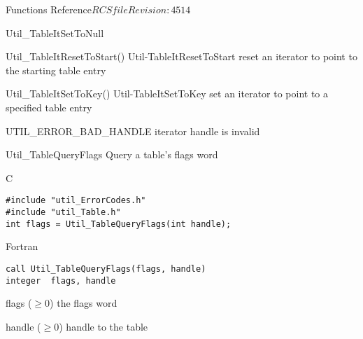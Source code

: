 \begin{cactuspart}{ Functions Reference}{$RCSfile$}{$Revision: 4514 $}
\begin{FunctionDescription}{Util\_TableItSetToNull}
\begin{SeeAlsoSection}
\begin{SeeAlso2} {Util\_TableItResetToStart()} {Util-TableItResetToStart}
reset an iterator to point to the starting table entry
\end{SeeAlso2}
\begin{SeeAlso2} {Util\_TableItSetToKey()} {Util-TableItSetToKey}
set an iterator to point to a specified table entry
\end{SeeAlso2}
\end{SeeAlsoSection}

\begin{ErrorSection}
\begin{Error}{UTIL\_ERROR\_BAD\_HANDLE}
iterator handle is invalid
\end{Error}
\end{ErrorSection}
\end{FunctionDescription}



\begin{FunctionDescription}{Util\_TableQueryFlags}
Query a table's flags word
\label{Util-TableQueryFlags}

\begin{SynopsisSection}
\begin{Synopsis}{C}
\begin{verbatim}
#include "util_ErrorCodes.h"
#include "util_Table.h"
int flags = Util_TableQueryFlags(int handle);
\end{verbatim}
\end{Synopsis}
\begin{Synopsis}{Fortran}
\begin{verbatim}
call Util_TableQueryFlags(flags, handle)
integer  flags, handle
\end{verbatim}
\end{Synopsis}
\end{SynopsisSection}

\begin{ResultSection}
\begin{Result}{flags ($\ge 0$)}
the flags word
\end{Result}
\end{ResultSection}

\begin{ParameterSection}
\begin{Parameter}{handle ($\ge 0$)}
handle to the table
\end{Parameter}
\end{ParameterSection}


\end{FunctionDescription}
\end{cactuspart}

